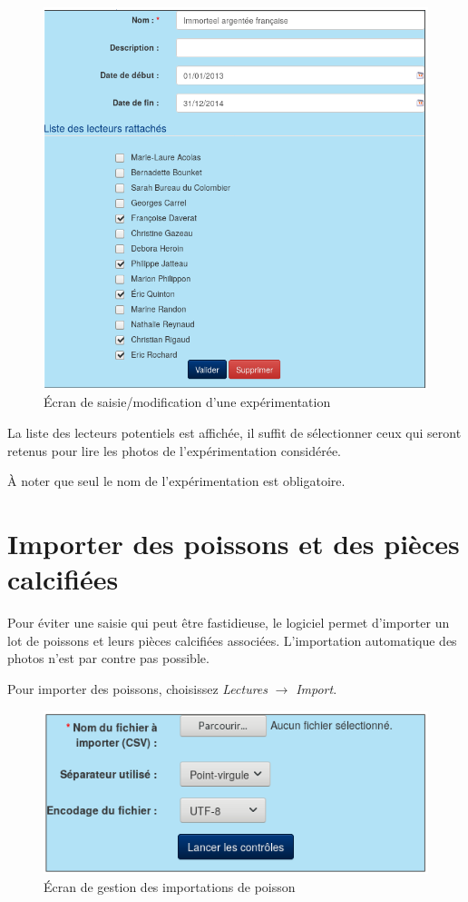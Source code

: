 \begin{figure}[H]
\includegraphics[width=\linewidth]{images/experimentation}
\caption{Écran de saisie/modification d'une expérimentation}
\end{figure}

La liste des lecteurs potentiels est affichée, il suffit de sélectionner ceux qui seront retenus pour lire les photos de l'expérimentation considérée.

À noter que seul le nom de l'expérimentation est obligatoire.

\section{Importer des poissons et des pièces calcifiées}

Pour éviter une saisie qui peut être fastidieuse, le logiciel permet d'importer un lot de poissons et leurs pièces calcifiées associées. L'importation automatique des photos n'est par contre pas possible.

Pour importer des poissons, choisissez \textit{Lectures} $\rightarrow$ \textit{Import}. 

\begin{figure}[H]
\centering
\includegraphics[width=0.7\linewidth]{images/import}
\caption{Écran de gestion des importations de poisson}
\end{figure}


